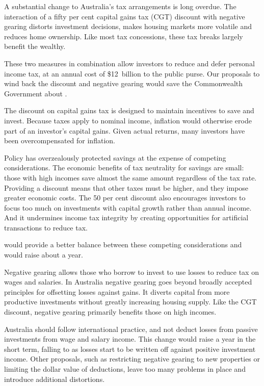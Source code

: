 \documentclass{grattan}\usepackage[]{graphicx}\usepackage[]{color}
\begin{document}
\newlength{\overviewextra}
\setlength{\overviewextra}{-2pt}
\addtolength{\columnsep}{\overviewextra}
\begin{overview}[-25pt] %
A substantial change to Australia's tax arrangements is long overdue. The interaction of a fifty per cent capital gains tax (CGT) discount with negative gearing distorts investment decisions, makes housing markets more volatile and reduces home ownership. Like most tax concessions, these tax breaks largely benefit the wealthy.

These two measures in combination allow investors to reduce and defer personal income tax, at an annual cost of \$12~billion to the public purse. Our proposals to wind back the discount and negative gearing would save the Commonwealth Government about . 

The discount on capital gains tax is designed to maintain incentives to save and invest.  Because taxes apply to nominal income, inflation would otherwise erode part of an investor's capital gains. Given actual returns, many investors have been overcompensated for inflation. 

Policy has overzealously protected savings at the expense of competing considerations. The economic benefits of tax neutrality for savings are small: those with high incomes save almost the same amount regardless of the tax rate. Providing a discount means that other taxes must be higher, and they impose greater economic costs. The 50 per cent discount also encourages investors to focus too much on investments with capital growth rather than annual income. And it undermines income tax integrity by creating opportunities for artificial transactions to reduce tax. 

 would provide a better balance between these competing considerations and would raise about  a year.

Negative gearing allows those who borrow to invest to use losses to reduce tax on wages and salaries. In Australia negative gearing goes beyond broadly accepted principles for offsetting losses against gains. It diverts capital from more productive investments without greatly increasing housing supply. Like the CGT discount, negative gearing primarily benefits those on high incomes.

Australia should follow international practice, and not deduct losses from passive investments from wage and salary income.  This change would raise  a year in the short term, falling to  as losses start to be written off against positive investment income. Other proposals, such as restricting negative gearing to new properties or limiting the dollar value of deductions, leave too many problems in place and introduce additional distortions. 


\end{overview}
\end{document}
